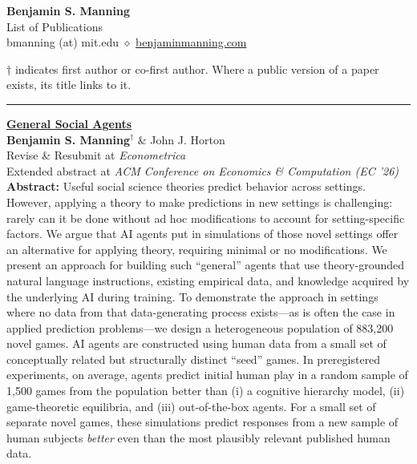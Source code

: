\documentclass[11pt]{article}
\newenvironment{publist}
  {\begin{list}{}{%
    \setlength{\leftmargin}{1.5em}%
    \setlength{\itemindent}{-1.5em}%
    \setlength{\itemsep}{10pt}%
    \setlength{\parsep}{0pt}%
    \setlength{\topsep}{4pt}}}
  {\end{list}}
\newcommand{\pubsection}[1]{\Needspace*{6\baselineskip}\vspace{6pt}{\large\scshape #1}\par\vspace{-4pt}\rule{\textwidth}{0.4pt}}
\begin{document}
\begin{center}
{\LARGE\bfseries Benjamin S. Manning}\\[4pt]
List of Publications\\[4pt]
bmanning (at) mit.edu $\diamond$ \href{https://benjaminmanning.com/}{benjaminmanning.com}
\end{center}

\vspace{4pt}
{\small $\dagger$ indicates first author or co-first author. Where a public version of a paper exists, its title links to it.}

\pubsection{Working Papers}
\begin{publist}
\item \href{https://benjaminmanning.io/files/general_social_agents.pdf}{\textbf{General Social Agents}}\\
\textbf{Benjamin S. Manning}$^\dagger$ \& John J. Horton\\
Revise \& Resubmit at \textit{Econometrica}\\
Extended abstract at \textit{ACM Conference on Economics \& Computation (EC '26)}\\[3pt]
{\footnotesize \textbf{Abstract: }
Useful social science theories predict behavior across settings.
However, applying a theory to make predictions in new settings is challenging: rarely can it be done without ad hoc modifications to account for setting-specific factors.
We argue that AI agents put in simulations of those novel settings offer an alternative for applying theory, requiring minimal or no modifications.
We present an approach for building such ``general'' agents that use theory-grounded natural language instructions, existing empirical data, and knowledge acquired by the underlying AI during training.
To demonstrate the approach in settings where no data from that data-generating process exists---as is often the case in applied prediction problems---we design a heterogeneous population of 883,200 novel games.
AI agents are constructed using human data from a small set of conceptually related but structurally distinct ``seed'' games.
In preregistered experiments, on average, agents predict initial human play in a random sample of 1,500 games from the population better than (i) a cognitive hierarchy model, (ii) game-theoretic equilibria, and (iii) out-of-the-box agents.
For a small set of separate novel games, these simulations predict responses from a new sample of human subjects \emph{better} even than the most plausibly relevant published human data.}


\end{publist}
\end{document}

